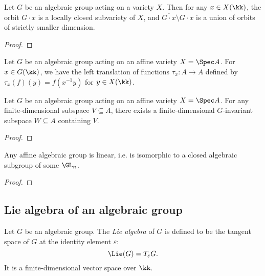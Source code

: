     \begin{proposition}\label{prop:orbit_is_locally_closed}
        Let \(G\) be an algebraic group acting on a variety \(X\).
        Then for any \(x \in X(\kk)\), the orbit \(G \cdot x\) is a locally closed subvariety of \(X\), and \(\overline{G \cdot x} \setminus G \cdot x \) is a union of orbits of strictly smaller dimension.
    \end{proposition}
    \begin{proof}
    \end{proof}

    Let \(G\) be an algebraic group acting on an affine variety \(X = \Spec A\).
    For \(x \in G(\kk)\), we have the left translation of functions \(\tau_x: A \to A\) defined by \(\tau_x(f)(y) = f(x^{-1}y)\) for \(y \in X(\kk)\).

    \begin{lemma}\label{lem:finite_dimensional_invariant_subspace}
        Let \(G\) be an algebraic group acting on an affine variety \(X = \Spec A\).
        For any finite-dimensional subspace \(V \subseteq A\), there exists a finite-dimensional \(G\)-invariant subspace \(W \subseteq A\) containing \(V\).
    \end{lemma}
    \begin{proof}
    \end{proof}

    \begin{theorem}\label{thm:affine_algebraic_group_is_linear}
        Any affine algebraic group is linear, i.e. is isomorphic to a closed algebraic subgroup of some \(\GL_n\).
    \end{theorem}
    \begin{proof}
    \end{proof}




\subsection{Lie algebra of an algebraic group}

    Let \(G\) be an algebraic group.
    The \emph{Lie algebra} of \(G\) is defined to be the tangent space of \(G\) at the identity element \(\varepsilon\):
    \[
        \Lie(G) = T_\varepsilon G.
    \]
    It is a finite-dimensional vector space over \(\kk\).

